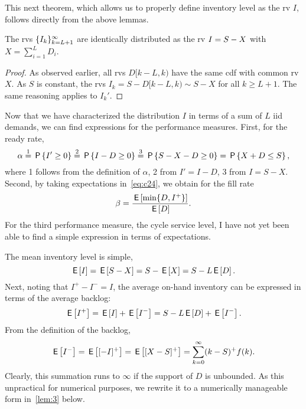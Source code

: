 \documentclass[stochastic-or.tex]{subfiles}
\begin{document}
This next theorem, which allows us to properly define inventory level as the rv $I$, follows directly from the above lemmas.
\begin{theorem}
The rvs $\{I_{k}\}_{k=L+1}^{\infty}$ are identically  distributed as the rv $I = S - X$ with $X=\sum_{i=1}^{L} D_{i}$.
\end{theorem}
\begin{proof}
As observed earlier, all rvs $D[k-L, k)$  have the same cdf with common rv $X$. As $S$ is constant, the rvs $I_{k} = S - D[k-L, k) \sim S - X$ for all $k\geq L+1$. The same reasoning applies to $I_{k}'$.
\end{proof}

Now that we have characterized the distribution $I$ in terms of a sum of $L$ iid demands, we can find expressions for the performance measures.
First, for the ready rate,
\begin{equation}
\label{eq:5}
\alpha \stackrel1=  \P{I'\geq 0} \stackrel2= \P{I - D \geq 0} \stackrel3= \P{S-X - D\geq 0} = \P{X+D\leq S},
\end{equation}
where 1 follows from the definition of $\alpha$, 2 from $I' = I- D$, 3 from $I=S-X$.
Second, by taking expectations in~\cref{eq:c24},  we obtain for the fill rate
\begin{equation}\label{eq:ic3}
\beta = \frac{\,\mathsf{E}\left[\min\{D, I^{+}\}\right]}{\,\mathsf{E}\left[D\right]}.
\end{equation}
For the third performance measure, the cycle service level, I have not yet been able to find a simple expression in terms of expectations.


The mean inventory level is simple,
\begin{equation*}
\,\mathsf{E}\left[I\right] = \,\mathsf{E}\left[S-X\right] = S - \,\mathsf{E}\left[X\right] = S - L\,\mathsf{E}\left[D\right].
\end{equation*}
Next, noting that $I^+ - I^- = I$, the average on-hand inventory can be expressed in terms of the average backlog:
\begin{equation*}
\,\mathsf{E}\left[I^+\right] = \,\mathsf{E}\left[I\right] + \,\mathsf{E}\left[I^-\right] = S - L \,\mathsf{E}\left[D\right] + \,\mathsf{E}\left[I^-\right].
\end{equation*}
From the definition of the backlog,
\begin{equation}\label{eq:ia22}
\,\mathsf{E}\left[I^-\right] = \,\mathsf{E}\left[[-I]^{+}\right] = \,\mathsf{E}\left[[X-S]^{+}\right] = \sum_{k=0}^\infty (k- S)^+f(k).
\end{equation}
Clearly, this summation runs to $\infty$ if the support of $D$ is unbounded.
As this unpractical for numerical purposes, we rewrite it to a numerically manageable form in~\cref{lem:3} below.
\end{document}
